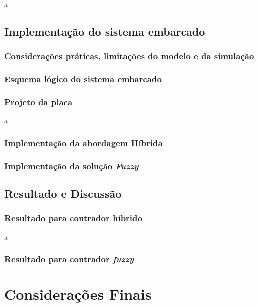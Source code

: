 a
	
\section{Implementação do sistema embarcado}

	\subsection{Considerações práticas, limitações do modelo e da simulação}

	\subsection{Esquema lógico do sistema embarcado}

	\subsection{Projeto da placa}
	
	a
	
	\subsection{Implementação da abordagem Híbrida}

	\subsection{Implementação da solução \textit{Fuzzy}}
	
\section{Resultado e Discussão}

	\subsection{Resultado para contrador híbrido}

	a
	
	\subsection{Resultado para contrador \textit{fuzzy}}

\chapter{Considerações Finais}
\vspace{-2.5 cm}

